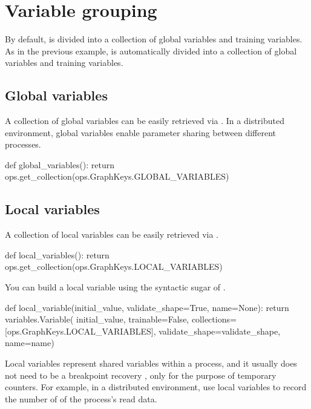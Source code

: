 \section{Variable grouping}
\begin{content}
By default,  is divided into a collection of global variables and training variables. As in the previous example,  is automatically divided into a collection of global variables and training variables.


\subsection{Global variables}
A collection of global variables can be easily retrieved via . In a distributed environment, global variables enable parameter sharing between different processes.

\begin{leftbar}
\begin{python}
def global_variables():
  return ops.get_collection(ops.GraphKeys.GLOBAL_VARIABLES)
\end{python}
\end{leftbar}


\subsection{Local variables}
A collection of local variables can be easily retrieved via .

\begin{leftbar}
\begin{python}
def local_variables():
  return ops.get_collection(ops.GraphKeys.LOCAL_VARIABLES)
\end{python}
\end{leftbar}

You can build a local variable using the syntactic sugar of .

\begin{leftbar}
\begin{python}
def local_variable(initial_value, validate_shape=True, name=None):
  return variables.Variable(
      initial_value, trainable=False,
      collections=[ops.GraphKeys.LOCAL_VARIABLES],
      validate_shape=validate_shape, name=name)
\end{python}
\end{leftbar}

Local variables represent shared variables within a process, and it usually does not need to be a breakpoint recovery , only for the purpose of temporary counters. For example, in a distributed environment, use local variables to record the number of  of the process's read data.



\end{content}
